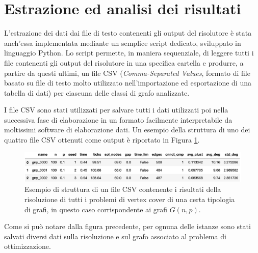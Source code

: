 
\section{Estrazione ed analisi dei risultati}
L'estrazione dei dati dai file di testo contenenti gli output del risolutore è stata anch'essa implementata mediante un semplice script dedicato, sviluppato in linguaggio Python. Lo script permette, in maniera sequenziale, di leggere tutti i file contenenti gli output del risolutore in una specifica cartella e produrre, a partire da questi ultimi, un file CSV (\textit{Comma-Separated Values}, formato di file basato su file di testo molto utilizzato nell'importazione ed esportazione di una tabella di dati) per ciascuna delle classi di grafo analizzate. 

I file CSV sono stati utilizzati per salvare tutti i dati utilizzati poi nella successiva fase di elaborazione in un formato facilmente interpretabile da moltissimi software di elaborazione dati. Un esempio della struttura di uno dei quattro file CSV ottenuti come output è riportato in Figura \ref{fig:csv}.

\begin{figure}[h!]
     \centering
       \includegraphics[scale=0.6]{images/csv.eps}
       \caption{Esempio di struttura di un file CSV contenente i risultati della risoluzione di tutti i problemi di vertex cover di una certa tipologia di grafi, in questo caso corrispondente ai grafi $G(n,p)$.}
        \label{fig:csv}
\end{figure}

Come si può notare dalla figura precedente, per ognuna delle istanze sono stati salvati diversi dati sulla risoluzione e sul grafo associato al problema di ottimizzazione. 

